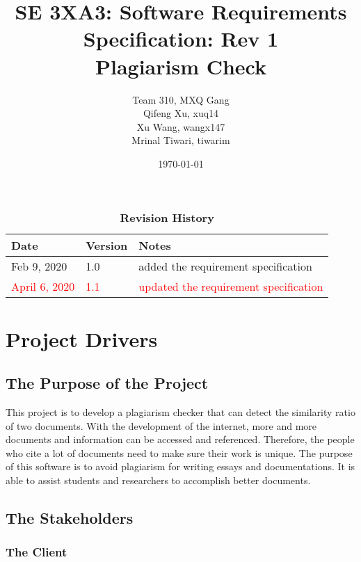 \documentclass[12pt, titlepage]{article}
\title{SE 3XA3: Software Requirements Specification: Rev 1\\\textbf{Plagiarism Check}}
\author{Team 310, MXQ Gang
		\\ Qifeng Xu, xuq14
		\\ Xu Wang, wangx147
		\\ Mrinal Tiwari, tiwarim
}
\date{\today}
\begin{document}
\maketitle

{
  \hypersetup{linkcolor=black}
  \tableofcontents
}
{
  \hypersetup{linkcolor=black}
  \listoftables
}

\listoffigures

\begin{table}[bp]
\caption{\bf Revision History}
\begin{tabularx}{\textwidth}{p{3cm}p{2cm}X}
\toprule {\bf Date} & {\bf Version} & {\bf Notes}\\
\midrule
Feb 9, 2020 & 1.0 & added the requirement specification\\
\midrule
\textcolor{red}{April 6, 2020} & \textcolor{red}{1.1} & \textcolor{red}{updated the requirement specification}\\
\bottomrule
\end{tabularx}
\end{table}

\newpage



\section{Project Drivers}

\subsection{The Purpose of the Project}

This project is to develop a plagiarism checker that can detect the similarity ratio of two documents. With the development of the internet, more and more documents and information can be accessed and referenced. Therefore, the people who cite a lot of documents need to make sure their work is unique. The purpose of this software is to avoid plagiarism for writing essays and documentations. It is able to assist students and researchers to accomplish better documents.  

\subsection{The Stakeholders}

\subsubsection{The Client}
\end{document}
